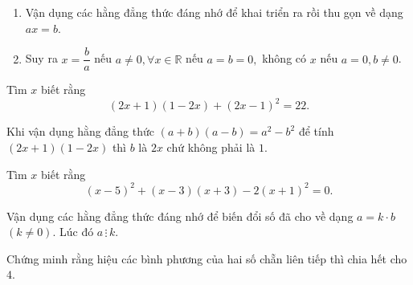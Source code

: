 \begin{dang}
	\begin{enumerate}[\tickEX]
		\item Vận dụng các hằng đẳng thức đáng nhớ để khai triển ra rồi thu gọn về dạng $ax = b$.
		\item Suy ra $x = \dfrac{b}{a}$ nếu $a \neq 0, \forall x \in \mathbb{R}$ nếu $a = b = 0,$ không có $x$ nếu $a = 0, b \neq 0$.
	\end{enumerate}
\end{dang}
\begin{vd}
	Tìm $x$ biết rằng \[(2x+1)(1-2x)+(2x-1)^2 = 22.\]
\begin{note}
	Khi vận dụng hằng đẳng thức $(a+b)(a-b) = a^2 - b^2$ để tính $(2x+1)(1-2x)$ thì $b$ là $2x$ chứ không phải là $1$.
\end{note}
\end{vd}
\begin{vd}
	Tìm $x$ biết rằng \[(x-5)^2 + (x-3)(x+3) -2(x+1)^2 = 0.\]
\end{vd}
\begin{dang}
	Vận dụng các hằng đẳng thức đáng nhớ để biến đổi số đã cho về dạng $a = k \cdot b$ $(k\neq 0)$. Lúc đó $a \,\vdots\, k$. 
\end{dang}
\begin{vd}
	Chứng minh rằng hiệu các bình phương của hai số chẵn liên tiếp thì chia hết cho $4$.
\end{vd}
